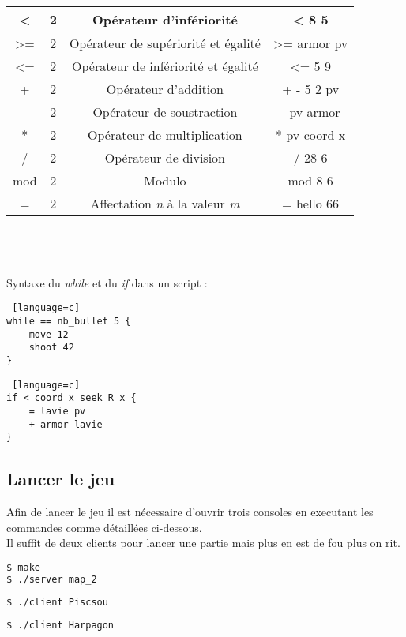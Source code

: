 \documentclass[a4paper, 11pt]{article}
\begin{document}
\begin{tabular}{|c|c|c|c|}
   \hline
	 < & 2 & Opérateur d'infériorité  & < 8 5 \\
	 \hline
   >= & 2 & Opérateur de supériorité et égalité  & >= armor pv \\
   \hline
   <= & 2 & Opérateur de infériorité et égalité  & <= 5 9 \\
   \hline
	 + & 2 & Opérateur d'addition & + - 5 2 pv \\
	 \hline
   - & 2 & Opérateur de soustraction & - pv armor \\
   \hline
   * & 2 & Opérateur de multiplication & * pv coord x \\
   \hline
	 / & 2 & Opérateur de division & / 28 6 \\
	 \hline
   mod & 2 & Modulo & mod 8 6 \\
   \hline
   = & 2 & Affectation \emph{n} à la valeur \emph{m}  & = hello 66 \\
   \hline
\end{tabular}
\\\\\\
Syntaxe du \emph{while} et du \emph{if} dans un script :
\begin {lstlisting} [language=c]
while == nb_bullet 5 {
	move 12
	shoot 42
}
\end{lstlisting}

\begin {lstlisting} [language=c]
if < coord x seek R x {
	= lavie pv
	+ armor lavie
}
\end{lstlisting}

\subsection{Lancer le jeu}
Afin de lancer le jeu il est nécessaire d'ouvrir trois consoles en executant les commandes comme détaillées ci-dessous.\\
Il suffit de deux clients pour lancer une partie mais plus en est de fou plus on rit.
\begin {lstlisting}[language=bash,title={Console - Serveur}]
$ make
$ ./server map_2
\end{lstlisting}
\begin {lstlisting}[language=bash,title={Console - Client 2}]
$ ./client Piscsou
\end{lstlisting}
\begin {lstlisting}[language=bash,title={Console - Client 3}]
$ ./client Harpagon
\end{lstlisting}
\end{document}
